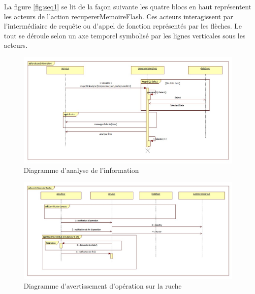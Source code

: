 \newpage

La figure \ref{fig:seq1} se lit de la façon suivante les quatre blocs en haut représentent les acteurs de l'action recupererMemoireFlash. Ces acteurs interagissent par l'intermédiaire de requête ou d'appel de fonction représentés par les flèches. Le tout se déroule selon un axe temporel symbolisé par les lignes verticales sous les acteurs.
\begin{figure}[h!]
\centering\includegraphics[scale=0.4]{analyserInformation.jpg}
\caption{\label{fig:seq2} Diagramme d'analyse de l'information}
\end{figure}
\begin{figure}[h!]
\centering\includegraphics[scale=0.4]{avertirOperationRuche.jpg}
\caption{\label{fig:seq3} Diagramme d'avertissement d'opération sur la ruche}
\end{figure}
